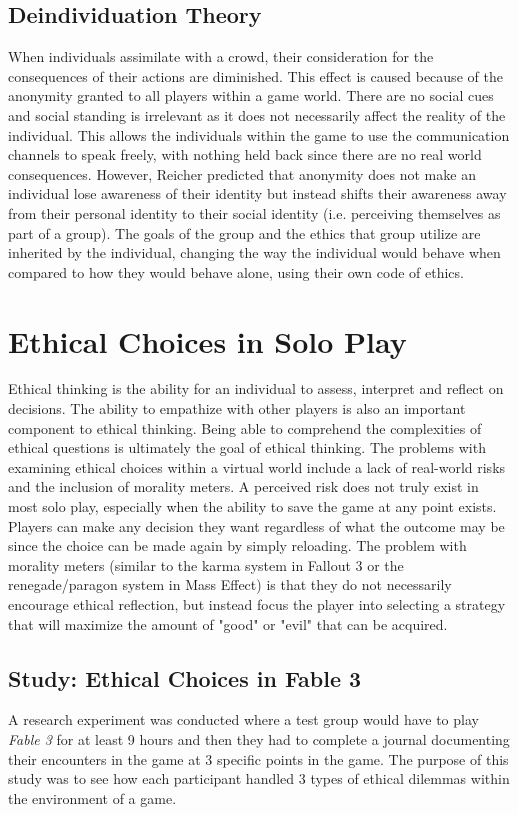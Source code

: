 \documentclass[12pt]{report}
\begin{document}
\subsection{Deindividuation Theory}

When individuals assimilate with a crowd, their consideration for the consequences of their actions are diminished. This effect is caused because of the anonymity granted to all players within a game world. There are no social cues and social standing is irrelevant as it does not necessarily affect the reality of the individual. This allows the individuals within the game to use the communication channels to speak freely, with nothing held back since there are no real world consequences. However, Reicher predicted that anonymity does not make an individual lose awareness of their identity but instead shifts their awareness away from their personal identity to their social identity (i.e. perceiving themselves as part of a group).\cite{Griefing} The goals of the group and the ethics that group utilize are inherited by the individual, changing the way the individual would behave when compared to how they would behave alone, using their own code of ethics.

\section{Ethical Choices in Solo Play}
Ethical thinking is the ability for an individual to assess, interpret and reflect on decisions. The ability to empathize with other players is also an important component to ethical thinking. Being able to comprehend the complexities of ethical questions is ultimately the goal of ethical thinking.\cite{Ethical_Choices_in_Fable_3} The problems with examining ethical choices within a virtual world include a lack of real-world risks and the inclusion of morality meters. A perceived risk does not truly exist in most solo play, especially when the ability to save the game at any point exists. Players can make any decision they want regardless of what the outcome may be since the choice can be made again by simply reloading. The problem with morality meters (similar to the karma system in Fallout 3 or the renegade/paragon system in Mass Effect) is that they do not necessarily encourage ethical reflection, but instead focus the player into selecting a strategy that will maximize the amount of "good" or "evil" that can be acquired.\cite{Ethical_Choices_in_Fable_3}

\subsection{Study: Ethical Choices in Fable 3\cite{Ethical_Choices_in_Fable_3}}
A research experiment was conducted where a test group would have to play \textit{Fable 3} for at least 9 hours and then they had to complete a journal documenting their encounters in the game at 3 specific points in the game. The purpose of this study was to see how each participant handled 3 types of ethical dilemmas within the environment of a game.
\end{document}
